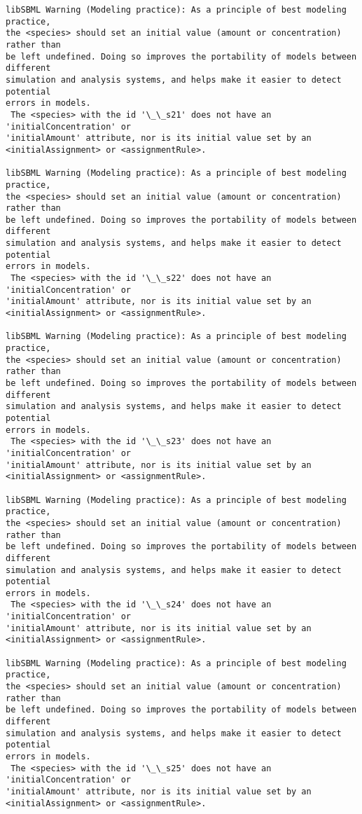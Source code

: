 \documentclass[11pt]{article}
\begin{document}
\begin{Verbatim}[commandchars=\\\{\}]
libSBML Warning (Modeling practice): As a principle of best modeling practice,
the <species> should set an initial value (amount or concentration) rather than
be left undefined. Doing so improves the portability of models between different
simulation and analysis systems, and helps make it easier to detect potential
errors in models.
 The <species> with the id '\_\_s21' does not have an 'initialConcentration' or
'initialAmount' attribute, nor is its initial value set by an
<initialAssignment> or <assignmentRule>.

libSBML Warning (Modeling practice): As a principle of best modeling practice,
the <species> should set an initial value (amount or concentration) rather than
be left undefined. Doing so improves the portability of models between different
simulation and analysis systems, and helps make it easier to detect potential
errors in models.
 The <species> with the id '\_\_s22' does not have an 'initialConcentration' or
'initialAmount' attribute, nor is its initial value set by an
<initialAssignment> or <assignmentRule>.

libSBML Warning (Modeling practice): As a principle of best modeling practice,
the <species> should set an initial value (amount or concentration) rather than
be left undefined. Doing so improves the portability of models between different
simulation and analysis systems, and helps make it easier to detect potential
errors in models.
 The <species> with the id '\_\_s23' does not have an 'initialConcentration' or
'initialAmount' attribute, nor is its initial value set by an
<initialAssignment> or <assignmentRule>.

libSBML Warning (Modeling practice): As a principle of best modeling practice,
the <species> should set an initial value (amount or concentration) rather than
be left undefined. Doing so improves the portability of models between different
simulation and analysis systems, and helps make it easier to detect potential
errors in models.
 The <species> with the id '\_\_s24' does not have an 'initialConcentration' or
'initialAmount' attribute, nor is its initial value set by an
<initialAssignment> or <assignmentRule>.

libSBML Warning (Modeling practice): As a principle of best modeling practice,
the <species> should set an initial value (amount or concentration) rather than
be left undefined. Doing so improves the portability of models between different
simulation and analysis systems, and helps make it easier to detect potential
errors in models.
 The <species> with the id '\_\_s25' does not have an 'initialConcentration' or
'initialAmount' attribute, nor is its initial value set by an
<initialAssignment> or <assignmentRule>.


\end{Verbatim}
\end{document}
